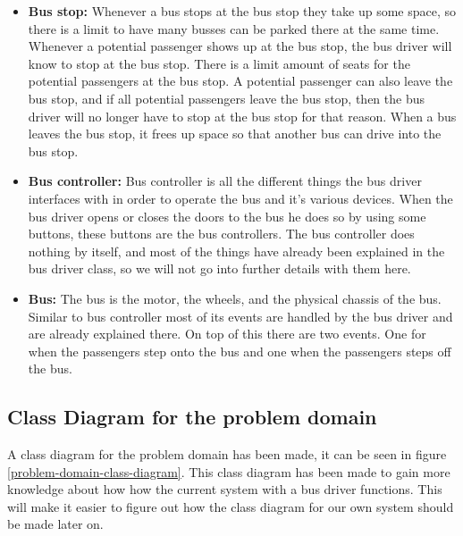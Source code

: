\begin{itemize}
\item \textbf{Bus stop:}
Whenever a bus stops at the bus stop they take up some space, so there is a limit to have many busses can be parked there at the same time. Whenever a potential passenger shows up at the bus stop, the bus driver will know to stop at the bus stop. There is a limit amount of seats for the potential passengers at the bus stop. A potential passenger can also leave the bus stop, and if all potential passengers leave the bus stop, then the bus driver will no longer have to stop at the bus stop for that reason. When a bus leaves the bus stop, it frees up space so that another bus can drive into the bus stop.
\item \textbf{Bus controller:}
Bus controller is all the different things the bus driver interfaces with in order to operate the bus and it's various devices. When the bus driver opens or closes the doors to the bus he does so by using some buttons, these buttons are the bus controllers. The bus controller does nothing by itself, and most of the things have already been explained in the bus driver class, so we will not go into further details with them here.
\item \textbf{Bus:}
The bus is the motor, the wheels, and the physical chassis of the bus. Similar to bus controller most of its events are handled by the bus driver and are already explained there. On top of this there are two events. One for when the passengers step onto the bus and one when the passengers steps off the bus.
\end{itemize}


\subsection{Class Diagram for the problem domain}

A class diagram for the problem domain has been made, it can be seen in figure \ref{problem-domain-class-diagram}. This class diagram has been made to gain more knowledge about how how the current system with a bus driver functions. This will make it easier to figure out how the class diagram for our own system should be made later on.

